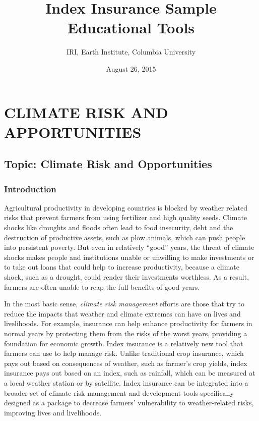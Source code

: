 \documentclass[letterpaper,10pt,english]{sphinxmanual}
\title{Index Insurance Sample Educational Tools}
\date{August 26, 2015}
\author{IRI, Earth Institute, Columbia University}
\begin{document}
\maketitle
\tableofcontents
{}\label{index_updated_educationalMat::doc}



\chapter{CLIMATE RISK AND APPORTUNITIES}
\label{whatisindexinsurance/Climate_risk_and_opportunities_updated_intro:climate-risk-and-opportunities}\label{whatisindexinsurance/Climate_risk_and_opportunities_updated_intro::doc}\label{whatisindexinsurance/Climate_risk_and_opportunities_updated_intro:climate-risk-and-apportunities}

\section{Topic: Climate Risk and Opportunities}
\label{whatisindexinsurance/Climate_risk_and_opportunities_updated_intro:topic-climate-risk-and-opportunities}

\subsection{Introduction}
\label{whatisindexinsurance/Climate_risk_and_opportunities_updated_intro:introduction}
Agricultural productivity in developing countries is blocked by weather related risks that prevent farmers from using fertilizer and high quality seeds. Climate shocks like droughts and floods often lead to food insecurity, debt and the destruction of productive assets, such as plow animals, which can push people into persistent poverty. But even in relatively ``good'' years, the threat of climate shocks makes people and institutions unable or unwilling to make investments or to take out loans that could help to increase productivity, because a climate shock, such as a drought, could render their investments worthless. As a result, farmers are often unable to reap the full benefits of good years.

In the most basic sense, \emph{climate risk management} efforts are those that try to reduce the impacts that weather and climate extremes can have on lives and livelihoods. For example, insurance can help enhance productivity for farmers in normal years by protecting them from the risks of the worst years, providing a foundation for economic growth. Index insurance is a relatively new tool that farmers can use to help manage risk. Unlike traditional crop insurance, which pays out based on consequences of weather, such as farmer’s crop yields, index insurance pays out based on an index, such as rainfall, which can be measured at a local weather station or by satellite.  Index insurance can be integrated into a broader set of climate risk management and development tools specifically designed as a package to decrease farmers’ vulnerability to weather-related risks, improving lives and livelihoods.
\end{document}
